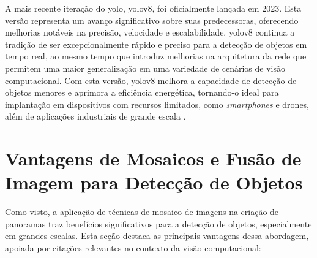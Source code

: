 A mais recente iteração do \gls{yolo}, \gls{yolo}v8, foi oficialmente lançada em 2023. Esta versão representa um avanço significativo sobre suas predecessoras, oferecendo melhorias notáveis na precisão, velocidade e escalabilidade. \gls{yolo}v8 continua a tradição de ser excepcionalmente rápido e preciso para a detecção de objetos em tempo real, ao mesmo tempo que introduz melhorias na arquitetura da rede que permitem uma maior generalização em uma variedade de cenários de visão computacional. Com esta versão, \gls{yolo}v8 melhora a capacidade de detecção de objetos menores e aprimora a eficiência energética, tornando-o ideal para implantação em dispositivos com recursos limitados, como \textit{smartphones} e drones, além de aplicações industriais de grande escala \cite{Jocher2023YOLOv8}.


\section{Vantagens de Mosaicos e Fusão de Imagem para Detecção de Objetos}

Como visto, a aplicação de técnicas de mosaico de imagens na criação de panoramas traz benefícios significativos para a detecção de objetos, especialmente em grandes escalas. Esta seção destaca as principais vantagens dessa abordagem, apoiada por citações relevantes no contexto da visão computacional:

